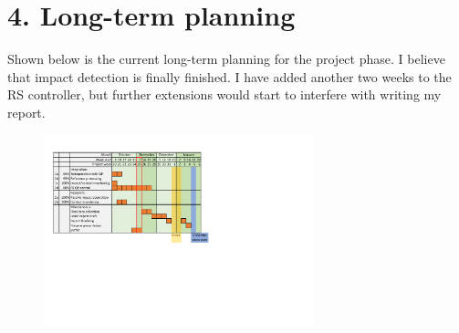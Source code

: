 \documentclass[11pt]{report}
\numberwithin{equation}{section}        %
\numberwithin{figure}{section}          %
\numberwithin{table}{section}           %
\begin{document}
  \section*{4. Long-term planning}
  Shown below is the current long-term planning for the project phase.  I believe that impact detection is finally finished. I have added another two weeks to the RS controller, but further extensions would start to interfere with writing my report.

  \begin{figure}[H]
  \centering
  \includegraphics[width=0.7\textwidth, trim={0.87cm 9.5cm 10cm 1.5cm},clip]{Graphics/planning v2.pdf}

  \label{fig:my_label}
  \end{figure}
\end{document}
